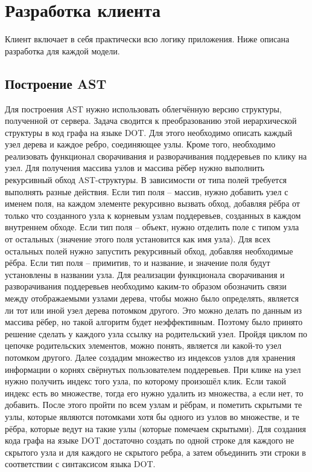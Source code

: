 \section{Разработка клиента} \label{ch5:sec2}
Клиент включает в себя практически всю логику приложения. Ниже описана разработка для каждой модели.
\subsection{Построение AST} \label{ch2:subsec-title-abbr}
Для построения AST нужно использовать облегчённую версию структуры, полученной от сервера. Задача сводится к преобразованию этой иерархической структуры в код графа на языке DOT. Для этого необходимо описать каждый узел дерева и каждое ребро, соединяющее узлы. Кроме того, необходимо реализовать функционал сворачивания и разворачивания поддеревьев по клику на узел.
Для получения массива узлов и массива рёбер нужно выполнить рекурсивный обход AST-структуры. В зависимости от типа полей требуется выполнять разные действия. Если тип поля – массив, нужно добавить узел с именем поля, на каждом элементе рекурсивно вызвать обход, добавляя рёбра от только что созданного узла к корневым узлам поддеревьев, созданных в каждом внутреннем обходе. Если тип поля – объект, нужно отделить поле с типом узла от остальных (значение этого поля установится как имя узла). Для всех остальных полей нужно запустить рекурсивный обход, добавляя необходимые рёбра. Если тип поля – примитив, то и название, и значение поля будут установлены в названии узла.
Для реализации функционала сворачивания и разворачивания поддеревьев необходимо каким-то образом обозначить связи между отображаемыми узлами дерева, чтобы можно было определять, является ли тот или иной узел дерева потомком другого. Это можно делать по данным из массива рёбер, но такой алгоритм будет неэффективным. Поэтому было принято решение сделать у каждого узла ссылку на родительский узел. Пройдя циклом по цепочке родительских элементов, можно понять, является ли какой-то узел потомком другого. Далее создадим множество из индексов узлов для хранения информации о корнях свёрнутых пользователем поддеревьев. При клике на узел нужно получить индекс того узла, по которому произошёл клик. Если такой индекс есть во множестве, тогда его нужно удалить из множества, а если нет, то добавить. После этого пройти по всем узлам и рёбрам, и пометить скрытыми те узлы, которые являются потомками хотя бы одного из узлов во множестве, и те рёбра, которые ведут на такие узлы (которые помечаем скрытыми).
Для создания кода графа на языке DOT достаточно создать по одной строке для каждого не скрытого узла и для каждого не скрытого ребра, а затем объединить эти строки в соответствии с синтаксисом языка DOT.
